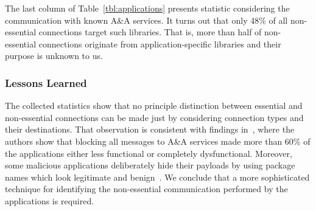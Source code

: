 The last column of Table~\ref{tbl:applications} 
%
presents statistic considering the communication with known A\&A services. 
It turns out that only 48\% of all non-essential connections target such libraries. 
That is, more than half of non-essential connections originate from application-specific libraries and their purpose is unknown to us.



\subsubsection{Lessons Learned}
The collected statistics show that no principle distinction between essential and non-essential connections  
can be made just by considering connection types and their destinations. 
That observation is consistent with findings in~\cite{Hornyack:Han:Jung:Schechter:Wetherall:CCS11}, where the authors 
show that blocking all messages to A\&A services made more than 60\% of the applications either less functional or completely dysfunctional. 
Moreover, some malicious applications deliberately hide their payloads by using package names which look legitimate and benign~\cite{Zhou:Jiang:SP2012}. We conclude that a more sophisticated 
technique for identifying the non-essential communication performed by the applications is required. 

